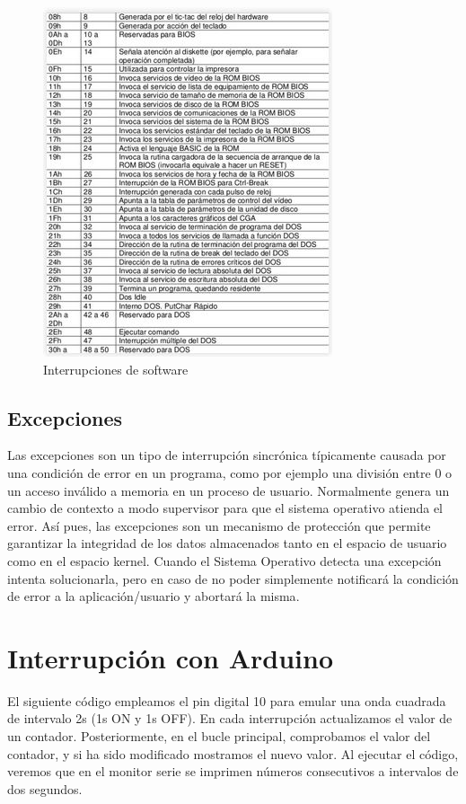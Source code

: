\documentclass{article}
\begin{document}
\begin{figure}[h]
\centering
\includegraphics[scale=1.2]{interrupciones2}
\caption{Interrupciones de software \cite{interHS}}
\label{fig:interrupciones2}
\end{figure}

\subsection{Excepciones}
Las excepciones son un tipo de interrupción sincrónica típicamente causada por una condición de error en un programa, como por ejemplo una división entre 0 o un acceso inválido a memoria en un proceso de usuario. Normalmente genera un cambio de contexto a modo supervisor para que el sistema operativo atienda el error. Así pues, las excepciones son un mecanismo de protección que permite garantizar la integridad de los datos almacenados tanto en el espacio de usuario como en el espacio kernel. Cuando el Sistema Operativo detecta una excepción intenta solucionarla, pero en caso de no poder simplemente notificará la condición de error a la aplicación/usuario y abortará la misma\cite{exc}. 

\section{Interrupción con Arduino}
El siguiente código empleamos el pin digital 10 para emular una onda cuadrada de intervalo 2s (1s ON y 1s OFF).
En cada interrupción actualizamos el valor de un contador. Posteriormente, en el bucle principal, comprobamos el valor del contador, y si ha sido modificado mostramos el nuevo valor.
Al ejecutar el código, veremos que en el monitor serie se imprimen números consecutivos a intervalos de dos segundos.
\end{document}
